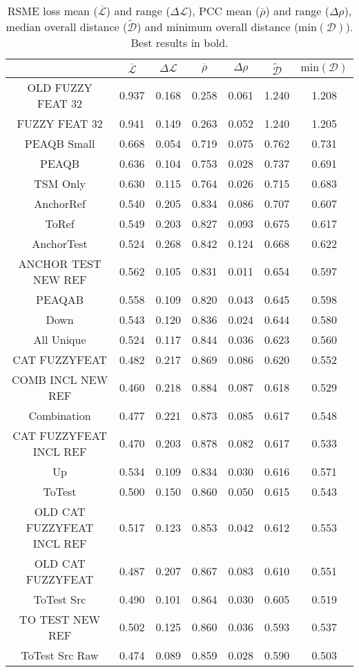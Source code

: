 \begin{table*}[ht]
\caption{RSME loss mean ($\overline{\mathcal{L}}$) and range ($\Delta\mathcal{L}$), PCC mean ($\overline{\rho}$) and range ($\Delta\rho$), median overall distance ($\widetilde{\mathcal{D}}$) and minimum overall distance ($\text{min}(\mathcal{D})$).  Best results in bold.}
\centering
\begin{ruledtabular}
\begin{tabular}{ccccccc}
 & $\overline{\mathcal{L}}$ & $\Delta\mathcal{L}$ & $\overline{\rho}$ & $\Delta\rho$ & $\widetilde{\mathcal{D}}$ & $\text{min}(\mathcal{D})$ \\
\hline
OLD FUZZY FEAT 32 & 0.937 & 0.168 & 0.258 & 0.061 & 1.240 & 1.208 \\
\hline
FUZZY FEAT 32 & 0.941 & 0.149 & 0.263 & 0.052 & 1.240 & 1.205 \\
\hline
PEAQB Small & 0.668 & 0.054 & 0.719 & 0.075 & 0.762 & 0.731 \\
\hline
PEAQB & 0.636 & 0.104 & 0.753 & 0.028 & 0.737 & 0.691 \\
\hline
TSM Only & 0.630 & 0.115 & 0.764 & 0.026 & 0.715 & 0.683 \\
\hline
AnchorRef & 0.540 & 0.205 & 0.834 & 0.086 & 0.707 & 0.607 \\
\hline
ToRef & 0.549 & 0.203 & 0.827 & 0.093 & 0.675 & 0.617 \\
\hline
AnchorTest & 0.524 & 0.268 & 0.842 & 0.124 & 0.668 & 0.622 \\
\hline
ANCHOR TEST NEW REF & 0.562 & 0.105 & 0.831 & 0.011 & 0.654 & 0.597 \\
\hline
PEAQAB & 0.558 & 0.109 & 0.820 & 0.043 & 0.645 & 0.598 \\
\hline
Down & 0.543 & 0.120 & 0.836 & 0.024 & 0.644 & 0.580 \\
\hline
All Unique & 0.524 & 0.117 & 0.844 & 0.036 & 0.623 & 0.560 \\
\hline
CAT FUZZYFEAT & 0.482 & 0.217 & 0.869 & 0.086 & 0.620 & 0.552 \\
\hline
COMB INCL NEW REF & 0.460 & 0.218 & 0.884 & 0.087 & 0.618 & 0.529 \\
\hline
Combination & 0.477 & 0.221 & 0.873 & 0.085 & 0.617 & 0.548 \\
\hline
CAT FUZZYFEAT INCL REF & 0.470 & 0.203 & 0.878 & 0.082 & 0.617 & 0.533 \\
\hline
Up & 0.534 & 0.109 & 0.834 & 0.030 & 0.616 & 0.571 \\
\hline
ToTest & 0.500 & 0.150 & 0.860 & 0.050 & 0.615 & 0.543 \\
\hline
OLD CAT FUZZYFEAT INCL REF & 0.517 & 0.123 & 0.853 & 0.042 & 0.612 & 0.553 \\
\hline
OLD CAT FUZZYFEAT & 0.487 & 0.207 & 0.867 & 0.083 & 0.610 & 0.551 \\
\hline
ToTest Src & 0.490 & 0.101 & 0.864 & 0.030 & 0.605 & 0.519 \\
\hline
TO TEST NEW REF & 0.502 & 0.125 & 0.860 & 0.036 & 0.593 & 0.537 \\
\hline
ToTest Src Raw & 0.474 & 0.089 & 0.859 & 0.028 & 0.590 & 0.503 \\
\end{tabular}
\end{ruledtabular}
\label{tab:RMSE_PCC}
\end{table*}
